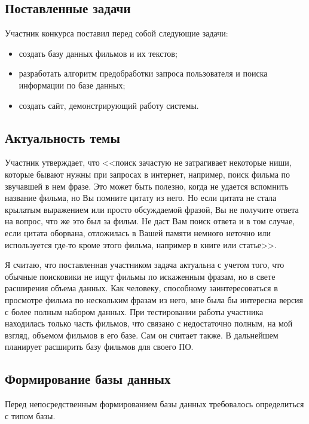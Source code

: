 \subsection{Поставленные задачи}

Участник конкурса поставил перед собой следующие задачи:
\begin{itemize}
	\item создать базу данных фильмов и их текстов;
	\item разработать алгоритм предобработки запроса пользователя и поиска
	информации по базе данных;
	\item создать сайт, демонстрирующий работу системы.
\end{itemize}


\subsection{Актуальность темы}

Участник утверждает, что <<поиск зачастую не затрагивает некоторые ниши, которые бывают нужны при запросах в интернет, например, поиск фильма по звучавшей в нем фразе. Это может быть полезно, когда не удается вспомнить название фильма, но Вы помните
цитату из него. Но если цитата не стала крылатым выражением или просто
обсуждаемой фразой, Вы не получите ответа на вопрос, что же это был за
фильм. Не даст Вам поиск ответа и в том случае, если цитата оборвана, отложилась в Вашей памяти немного неточно или
используется где-то кроме этого фильма, например в книге или статье>>.

Я считаю, что поставленная участником задача актуальна с учетом того, что обычные поисковики не ищут фильмы по искаженным фразам, но в свете расширения объема данных. Как человеку, способному заинтересоваться в просмотре фильма по нескольким фразам из него, мне была бы интересна версия с более полным набором данных. При тестировании работы участника находилась только часть фильмов, что связано с недостаточно полным, на мой взгляд, объемом фильмов в его базе. Сам он считает также. В дальнейшем планирует расширить базу фильмов для своего ПО.

\subsection{Формирование базы данных}

Перед непосредственным формированием базы данных требовалось определиться с типом базы.

